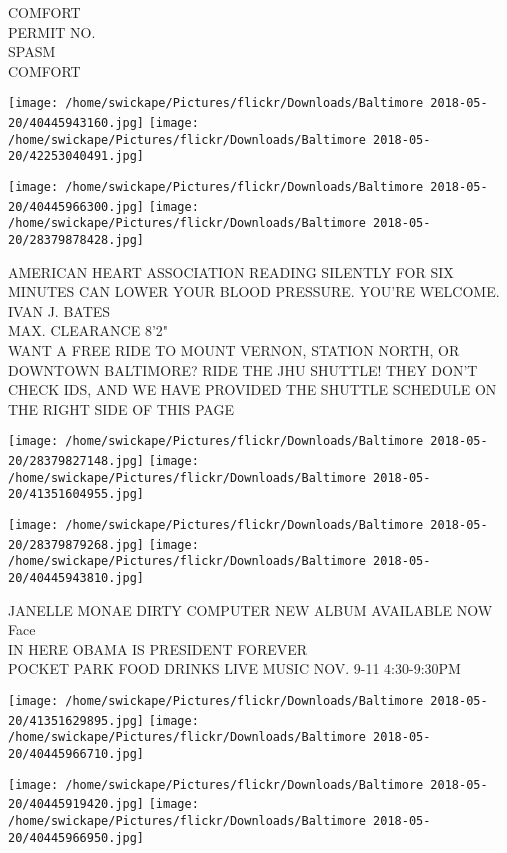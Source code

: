 \documentclass[10pt,letterpaper]{article}
\begin{document}
COMFORT\\
PERMIT NO.\\
SPASM\\
COMFORT
\pagebreak

\texttt{[image: /home/swickape/Pictures/flickr/Downloads/Baltimore 2018-05-20/40445943160.jpg]}
\texttt{[image: /home/swickape/Pictures/flickr/Downloads/Baltimore 2018-05-20/42253040491.jpg]}

\texttt{[image: /home/swickape/Pictures/flickr/Downloads/Baltimore 2018-05-20/40445966300.jpg]}
\texttt{[image: /home/swickape/Pictures/flickr/Downloads/Baltimore 2018-05-20/28379878428.jpg]}

AMERICAN HEART ASSOCIATION READING SILENTLY FOR SIX MINUTES CAN LOWER YOUR BLOOD PRESSURE.  YOU'RE WELCOME.\\
IVAN J. BATES\\
MAX. CLEARANCE 8'2"\\
WANT A FREE RIDE TO MOUNT VERNON, STATION NORTH, OR DOWNTOWN BALTIMORE?  RIDE THE JHU SHUTTLE!  THEY DON'T CHECK IDS, AND WE HAVE PROVIDED THE SHUTTLE SCHEDULE ON THE RIGHT SIDE OF THIS PAGE
\pagebreak

\texttt{[image: /home/swickape/Pictures/flickr/Downloads/Baltimore 2018-05-20/28379827148.jpg]}
\texttt{[image: /home/swickape/Pictures/flickr/Downloads/Baltimore 2018-05-20/41351604955.jpg]}

\texttt{[image: /home/swickape/Pictures/flickr/Downloads/Baltimore 2018-05-20/28379879268.jpg]}
\texttt{[image: /home/swickape/Pictures/flickr/Downloads/Baltimore 2018-05-20/40445943810.jpg]}

JANELLE MONAE DIRTY COMPUTER NEW ALBUM AVAILABLE NOW\\
Face\\
IN HERE OBAMA IS PRESIDENT FOREVER\\
POCKET PARK FOOD DRINKS LIVE MUSIC NOV. 9{-}11 4:30{-}9:30PM
\pagebreak

\texttt{[image: /home/swickape/Pictures/flickr/Downloads/Baltimore 2018-05-20/41351629895.jpg]}
\texttt{[image: /home/swickape/Pictures/flickr/Downloads/Baltimore 2018-05-20/40445966710.jpg]}

\texttt{[image: /home/swickape/Pictures/flickr/Downloads/Baltimore 2018-05-20/40445919420.jpg]}
\texttt{[image: /home/swickape/Pictures/flickr/Downloads/Baltimore 2018-05-20/40445966950.jpg]}
\end{document}
